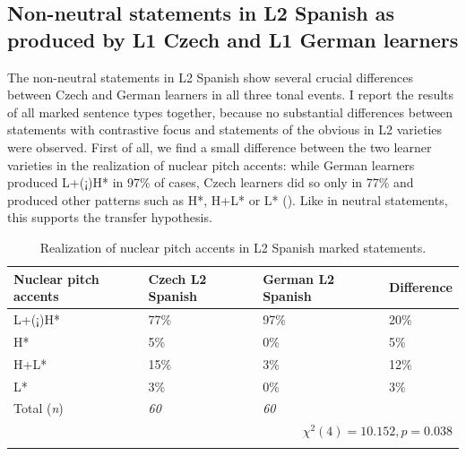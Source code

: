 \subsection{Non-neutral statements in L2 Spanish as produced by L1 Czech and L1 German learners}\label{sec:4.2.2}

The non-neutral statements in L2 Spanish show several crucial differences between Czech and German learners in all three tonal events. I report the results of all marked sentence types together, because no substantial differences between statements with contrastive focus and statements of the obvious in L2 varieties were observed. First of all, we find a small difference between the two learner varieties in the realization of nuclear pitch accents: while German learners produced L+(¡)H* in 97\% of cases, Czech learners did so only in 77\% and produced other patterns such as H*, H+L* or L* (). Like in neutral statements, this supports the transfer hypothesis.

\begin{table}
\begin{tabularx}{\textwidth}{lYYY}

\lsptoprule

{Nuclear pitch accents} & {Czech L2 Spanish} & {German L2 Spanish} & {Difference}\\
\midrule
L+(¡)H* &  77\% &  97\% &  20\%\\
H* &  5\% &  0\% & 5\%\\
H+L* &  15\% &  3\% &  12\%\\
L* &  3\% &  0\% & 3\%\\
\midrule
Total (\textit{n}) & {\itshape 60} & {\itshape 60} &  \\
\\
\lspbottomrule
\end{tabularx}

\caption{Realization of nuclear pitch accents in L2 Spanish marked statements.}
\label{tab:4.11}
\end{table}


